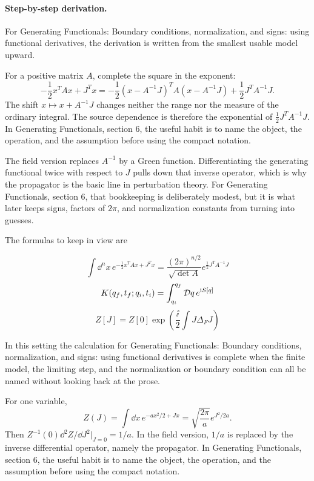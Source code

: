 \paragraph{Step-by-step derivation.}

For Generating Functionals: Boundary conditions, normalization, and signs: using functional derivatives, the derivation is written from the smallest usable model upward.

For a positive matrix \(A\), complete the square in the exponent:
\[
  -\frac12x^TAx+J^Tx
  =
  -\frac12(x-A^{-1}J)^TA(x-A^{-1}J)
  +\frac12J^TA^{-1}J.
\]
The shift \(x\mapsto x+A^{-1}J\) changes neither the range nor the measure of the ordinary integral.  The source dependence is therefore the exponential of \(\frac12J^TA^{-1}J\).  In Generating Functionals, section 6, the useful habit is to name the object, the operation, and the assumption before using the compact notation.

The field version replaces \(A^{-1}\) by a Green function.  Differentiating the generating functional twice with respect to \(J\) pulls down that inverse operator, which is why the propagator is the basic line in perturbation theory.  For Generating Functionals, section 6, that bookkeeping is deliberately modest, but it is what later keeps signs, factors of \(2\pi\), and normalization constants from turning into guesses.

The formulas to keep in view are

\[
  \int\dd^n x\,e^{-\frac12x^TAx+J^Tx}=\frac{(2\pi)^{n/2}}{\sqrt{\det A}}e^{\frac12J^TA^{-1}J}
\]
\[
  K(q_f,t_f;q_i,t_i)=\int_{q_i}^{q_f}\mathcal D q\,e^{\mathrm i S[q]}
\]
\[
  Z[J]=Z[0]\exp\left(\frac{\ii}{2}\int J\Delta_FJ\right)
\]

In this setting the calculation for Generating Functionals: Boundary conditions, normalization, and signs: using functional derivatives is complete when the finite model, the limiting step, and the normalization or boundary condition can all be named without looking back at the prose.




\begin{example}
For one variable,
\[
  Z(J)=\int\dd x\,e^{-ax^2/2+Jx}
  =\sqrt{\frac{2\pi}{a}}e^{J^2/2a}.
\]
Then \(Z^{-1}(0)\dd^2Z/\dd J^2|_{J=0}=1/a\).  In the field version, \(1/a\) is replaced by the inverse differential operator, namely the propagator.  In Generating Functionals, section 6, the useful habit is to name the object, the operation, and the assumption before using the compact notation.
\end{example}



